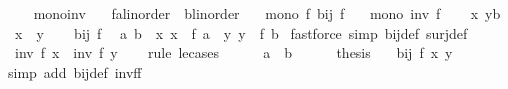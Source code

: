 \begin{isabellebody}
\ \ \isamarkupfalse%
\isanewline
{}\isamarkupfalse%
%
\endisatagproof
{\isafoldproof}%
%
\isadelimproof
\isanewline
%
\endisadelimproof
\isanewline
\isanewline
{}\isamarkupfalse%
\ mono{\isacharunderscore}{\kern0pt}inv{\isacharcolon}{\kern0pt}\isanewline
\ \ \ f{\isacharcolon}{\kern0pt}{\isacharcolon}{\kern0pt}{\isachardoublequoteopen}{\isacharprime}{\kern0pt}a{\isacharcolon}{\kern0pt}{\isacharcolon}{\kern0pt}linorder\ {\isasymRightarrow}\ {\isacharprime}{\kern0pt}b{\isacharcolon}{\kern0pt}{\isacharcolon}{\kern0pt}linorder{\isachardoublequoteclose}\isanewline
\ \ \ {\isachardoublequoteopen}mono\ f{\isachardoublequoteclose}\ {\isachardoublequoteopen}bij\ f{\isachardoublequoteclose}\isanewline
\ \ \ {\isachardoublequoteopen}mono\ {\isacharparenleft}{\kern0pt}inv\ f{\isacharparenright}{\kern0pt}{\isachardoublequoteclose}\isanewline
%
\isadelimproof
%
\endisadelimproof
%
\isatagproof
{}\isamarkupfalse%
\isanewline
\ \ \isamarkupfalse%
\ x\ y{\isacharcolon}{\kern0pt}{\isacharcolon}{\kern0pt}{\isacharprime}{\kern0pt}b\ \isamarkupfalse%
\ {\isachardoublequoteopen}x\ {\isasymle}\ y{\isachardoublequoteclose}\isanewline
\ \ \isamarkupfalse%
\ {\isacartoucheopen}bij\ f{\isacartoucheclose}\ \isamarkupfalse%
\ a\ b\ \ x{\isacharcolon}{\kern0pt}\ {\isachardoublequoteopen}x\ {\isacharequal}{\kern0pt}\ f\ a{\isachardoublequoteclose}\ \ y{\isacharcolon}{\kern0pt}\ {\isachardoublequoteopen}y\ {\isacharequal}{\kern0pt}\ f\ b{\isachardoublequoteclose}\ \isamarkupfalse%
{\isacharparenleft}{\kern0pt}fastforce\ simp{\isacharcolon}{\kern0pt}\ bij{\isacharunderscore}{\kern0pt}def\ surj{\isacharunderscore}{\kern0pt}def{\isacharparenright}{\kern0pt}\isanewline
\ \ \isamarkupfalse%
\ {\isachardoublequoteopen}inv\ f\ x\ {\isasymle}\ inv\ f\ y{\isachardoublequoteclose}\isanewline
\ \ \isamarkupfalse%
\ {\isacharparenleft}{\kern0pt}rule\ le{\isacharunderscore}{\kern0pt}cases{\isacharparenright}{\kern0pt}\isanewline
\ \ \ \ \isamarkupfalse%
\ {\isachardoublequoteopen}a\ {\isasymle}\ b{\isachardoublequoteclose}\isanewline
\ \ \ \ \isamarkupfalse%
\ {\isacharquery}{\kern0pt}thesis\ \isamarkupfalse%
\ \ {\isacartoucheopen}bij\ f{\isacartoucheclose}\ x\ y\ \isamarkupfalse%
{\isacharparenleft}{\kern0pt}simp\ add{\isacharcolon}{\kern0pt}\ bij{\isacharunderscore}{\kern0pt}def\ inv{\isacharunderscore}{\kern0pt}f{\isacharunderscore}{\kern0pt}f{\isacharparenright}{\kern0pt}\isanewline

\end{isabellebody}
